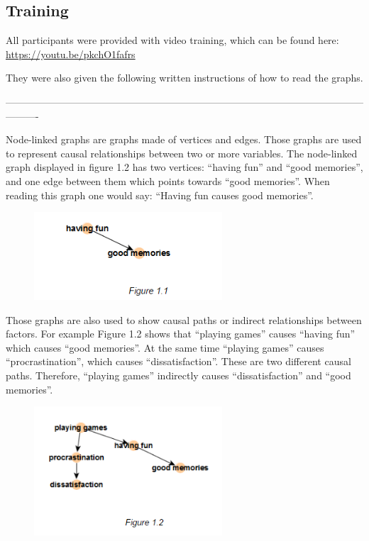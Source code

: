 \documentclass{l4proj}
\begin{document}
\begin{appendices}
\section{Training}

All participants were provided with video training, which can be found here: \url{https://youtu.be/pkchO1fafrs}

They were also given the following written instructions of how to read the graphs.

----------------------------------------------------------------------------------------------------------------------

Node-linked graphs are graphs made of vertices and edges. Those graphs are used to
represent causal relationships between two or more variables. The node-linked graph displayed
in figure 1.2 has two vertices: “having fun” and “good memories”, and one edge between them
which points towards “good memories”. When reading this graph one would say: “Having fun
causes good memories”.

\begin{figure}[H]
\centering
\includegraphics[width=7cm]{images/training11.PNG}
\caption{}
\label{training11}
\end{figure}

Those graphs are also used to show causal paths or indirect relationships between factors.
For example Figure 1.2 shows that “playing games” causes “having fun” which causes “good
memories”. At the same time “playing games” causes “procrastination”, which causes
“dissatisfaction”. These are two different causal paths. Therefore, “playing games” indirectly
causes “dissatisfaction” and “good memories”.

\begin{figure}[H]
\centering
\includegraphics[width=7cm]{images/training12.PNG}
\caption{}
\label{training12}
\end{figure}


\end{appendices}
\end{document}
